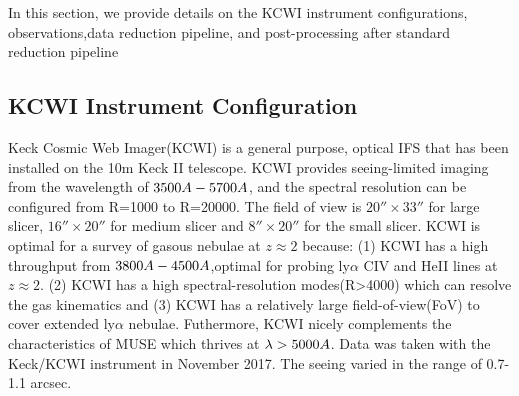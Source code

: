 \documentclass[../main.tex]{subfiles}
\begin{document}
	In this section, we provide details on the KCWI instrument configurations, observations,data reduction pipeline, and post-processing after standard reduction pipeline
\subsection{KCWI Instrument Configuration}
Keck Cosmic Web Imager(KCWI) is a general purpose, optical IFS that has been installed on the 10m Keck II telescope. KCWI provides seeing-limited imaging from the wavelength of $3500 \AA - 5700 \AA$, and the spectral resolution can be configured from R=1000 to R=20000. The field of view is $20'' \times 33''$ for large slicer, $16'' \times 20''$ for medium slicer and $8'' \times 20''$ for the small slicer. KCWI is optimal for a survey of gasous nebulae at $z \approx 2$ because: (1) KCWI has a high throughput from $3800 \AA - 4500 \AA$,optimal for probing ly$\alpha$ CIV and HeII lines at $z \approx 2$. (2) KCWI has a high spectral-resolution modes(R>4000) which can resolve the gas kinematics and (3) KCWI has a relatively large field-of-view(FoV) to cover extended ly$\alpha$ nebulae. Futhermore, KCWI nicely complements the characteristics of MUSE which thrives at $\lambda> 5000 \AA$. Data was taken with the Keck/KCWI instrument in November 2017. The seeing varied in the range of 0.7-1.1 arcsec.
\end{document}
